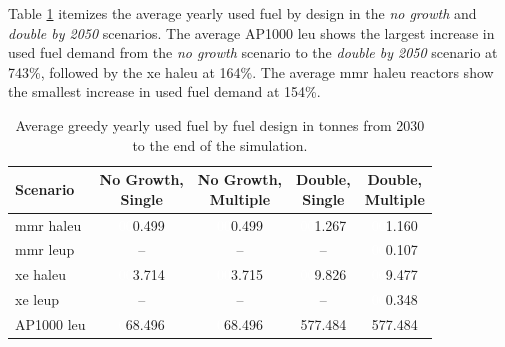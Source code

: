 Table \ref{tab:greedy_used_avg} itemizes the average yearly used fuel by design in the \textit{no growth} and \textit{double by 2050} scenarios. The average AP1000 \gls{leu} shows the largest increase in used fuel demand from the \textit{no growth} scenario to the \textit{double by 2050} scenario at 743\%, followed by the \gls{xe} \gls{haleu} at 164\%. The average \gls{mmr} \gls{haleu} reactors show the smallest increase in used fuel demand at 154\%.


\begin{table}[H]
  \centering
  \caption{Average greedy yearly used fuel by fuel design in tonnes from 2030 to the end of the simulation.}
  \label{tab:greedy_used_avg}
  \begin{tabular}{l c c c c}
     \toprule
     Scenario & \shortstack{No Growth,\\ Single} & \shortstack{No Growth,\\ Multiple} & \shortstack{Double,\\ Single} & \shortstack{Double,\\ Multiple}  \\
     \midrule
     \gls{mmr} \gls{haleu}   & \textcolor{white}{00}0.499    & \textcolor{white}{00}0.499   & \textcolor{white}{00}1.267    & \textcolor{white}{00}1.160    \\
     \gls{mmr} \gls{leup}    & --       & --      & --       & \textcolor{white}{00}0.107    \\
     \gls{xe} \gls{haleu}    & \textcolor{white}{00}3.714    & \textcolor{white}{00}3.715   & \textcolor{white}{00}9.826    & \textcolor{white}{00}9.477    \\
     \gls{xe} \gls{leup}     & --       & --      & --       & \textcolor{white}{00}0.348    \\
     AP1000 \gls{leu}        & \textcolor{white}{0}68.496   & \textcolor{white}{0}68.496  & 577.484  & 577.484  \\
     \hline
  \end{tabular}
\end{table}


